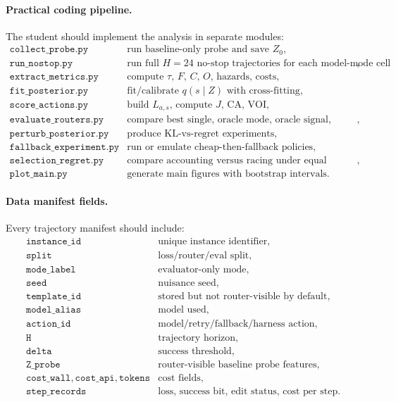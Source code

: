 \documentclass{article}
\begin{document}
\paragraph{Practical coding pipeline.}
The student should implement the analysis in separate modules:
\[
\begin{array}{ll}
    \texttt{collect\_probe.py} &
    \text{run baseline-only probe and save \(Z_0\)},\\
    \texttt{run\_nostop.py} &
    \text{run full \(H=24\) no-stop trajectories for each model-mode cell},\\
    \texttt{extract\_metrics.py} &
    \text{compute \(\tau\), \(F\), \(C\), \(O\), hazards, costs},\\
    \texttt{fit\_posterior.py} &
    \text{fit/calibrate \(q(s\mid Z)\) with cross-fitting},\\
    \texttt{score\_actions.py} &
    \text{build \(L_{a,s}\), compute \(J\), \(\mathrm{CA}\), \(\mathrm{VOI}\)},\\
    \texttt{evaluate\_routers.py} &
    \text{compare best single, oracle mode, oracle signal, learned, controls},\\
    \texttt{perturb\_posterior.py} &
    \text{produce KL-vs-regret experiments},\\
    \texttt{fallback\_experiment.py} &
    \text{run or emulate cheap-then-fallback policies},\\
    \texttt{selection\_regret.py} &
    \text{compare accounting versus racing under equal evaluation budgets},\\
    \texttt{plot\_main.py} &
    \text{generate main figures with bootstrap intervals}.
\end{array}
\]

\paragraph{Data manifest fields.}
Every trajectory manifest should include:
\[
\begin{array}{ll}
    \texttt{instance\_id} & \text{unique instance identifier},\\
    \texttt{split} & \text{loss/router/eval split},\\
    \texttt{mode\_label} & \text{evaluator-only mode},\\
    \texttt{seed} & \text{nuisance seed},\\
    \texttt{template\_id} & \text{stored but not router-visible by default},\\
    \texttt{model\_alias} & \text{model used},\\
    \texttt{action\_id} & \text{model/retry/fallback/harness action},\\
    \texttt{H} & \text{trajectory horizon},\\
    \texttt{delta} & \text{success threshold},\\
    \texttt{Z\_probe} & \text{router-visible baseline probe features},\\
    \texttt{cost\_wall},\texttt{cost\_api},\texttt{tokens} & \text{cost fields},\\
    \texttt{step\_records} & \text{loss, success bit, edit status, cost per step}.
\end{array}
\]
\end{document}
